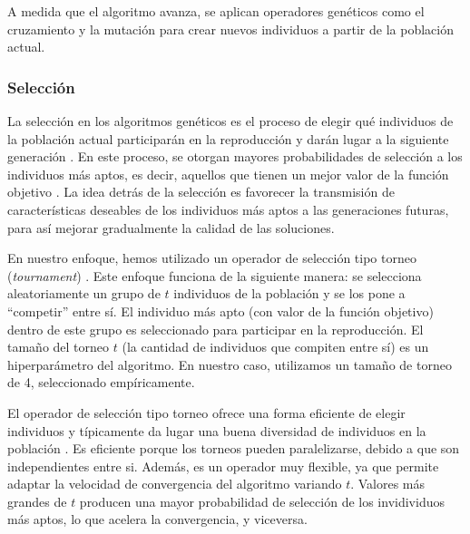 A medida que el algoritmo avanza, se aplican operadores genéticos como el cruzamiento y la mutación para crear nuevos individuos a partir de la población actual.

\subsubsection{Selección}


La selección en los algoritmos genéticos es el proceso de elegir qué individuos de la población actual participarán en la reproducción y darán lugar a la siguiente generación \cite{Goldberg:1989}. En este proceso, se otorgan mayores probabilidades de selección a los individuos más aptos, es decir, aquellos que tienen un mejor valor de la función objetivo \cite{Goldberg:1989} .  La idea detrás de la selección es favorecer la transmisión de características deseables de los individuos más aptos a las generaciones futuras, para así mejorar gradualmente la calidad de las soluciones.

En nuestro enfoque, hemos utilizado un operador de selección tipo torneo (\emph{tournament}) \cite{Goldberg:1989}. Este enfoque funciona de la siguiente manera: se selecciona aleatoriamente un grupo de $t$ individuos de la población y se los pone a ``competir'' entre sí. El individuo más apto (con valor de la función objetivo) dentro de este grupo es seleccionado para participar en la reproducción. El tamaño del torneo $t$ (la cantidad de individuos que compiten entre sí) es un hiperparámetro del algoritmo. En nuestro caso, utilizamos un tamaño de torneo de 4, seleccionado empíricamente.

El operador de selección tipo torneo ofrece una forma eficiente de elegir individuos y típicamente da lugar una buena diversidad de individuos en la población \cite{Goldberg:1989}. Es eficiente porque los torneos pueden paralelizarse, debido a que son independientes entre si. Además, es un operador muy flexible, ya que permite adaptar la velocidad de convergencia del algoritmo variando $t$. Valores más grandes de $t$ producen una mayor probabilidad de selección de los invidividuos más aptos, lo que acelera la convergencia, y viceversa. 


